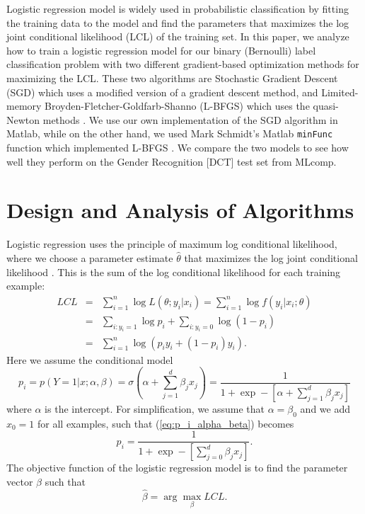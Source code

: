 \documentclass{article} %
\newcommand{\argmax}{\arg\!\max}
\begin{document}
Logistic regression model is widely used in probabilistic classification by fitting the training data to the model and find the parameters that maximizes the log joint conditional likelihood (LCL) of the training set.
In this paper, we analyze how to train a logistic regression model for our binary (Bernoulli) label classification problem with two different gradient-based optimization methods for maximizing the LCL\@.
These two algorithms are Stochastic Gradient Descent (SGD) which uses a modified version of a gradient descent method, and Limited-memory Broyden-Fletcher-Goldfarb-Shanno (L-BFGS) which uses the quasi-Newton methods \cite{wiki_lbfgs}.
We use our own implementation of the SGD algorithm in Matlab, while on the other hand, we used Mark Schmidt's Matlab {\tt minFunc} function which implemented L-BFGS \cite{minFunc}.
We compare the two models to see how well they perform on the Gender Recognition [DCT] test set from MLcomp.

\section{Design and Analysis of Algorithms}
\label{sec:algorithms}



Logistic regression uses the principle of maximum log conditional likelihood, where we choose a parameter estimate $\hat{\theta}$ that maximizes the log joint conditional likelihood \cite{elkan}. This is the sum of the log conditional likelihood for each training example:
\begin{eqnarray}
\label{LCL}
LCL &=& \sum_{i=1}^{n} \log L(\theta;y_i|x_i) = \sum_{i=1}^{n} \log f(y_i|x_i;\theta) \nonumber \\
    &=& \sum_{i:y_i=1} \log p_i + \sum_{i:y_i=0} \log (1-p_i) \nonumber \\
    &=& \sum_{i=1}^{n} \log (p_iy_i +(1-p_i)y_i).
\end{eqnarray}
Here we assume the conditional model
\begin{equation} \label{eq:p_i_alpha_beta}
p_i = p(Y=1|x;\alpha,\beta) = \sigma(\alpha + \sum_{j=1}^{d}\beta_{j}x_j) = \frac{1}{1+\exp-[\alpha+\sum_{j=1}^{d}\beta_{j}x_j]}
\end{equation}
where $\alpha$ is the intercept. For simplification, we assume that $\alpha = \beta_0$ and we add $x_0 = 1$ for all examples, such that (\ref{eq:p_i_alpha_beta}) becomes
\begin{equation} \label{eq:p_i}
p_i = \frac{1}{1+\exp-[\sum_{j=0}^{d}\beta_{j}x_j]}.
\end{equation}
The objective function of the logistic regression model is to find the parameter vector $\hat{\beta}$ such that
\begin{equation} \label{eq:objfun}
\hat{\beta} = \argmax_{\beta} LCL.
\end{equation}
\end{document}
